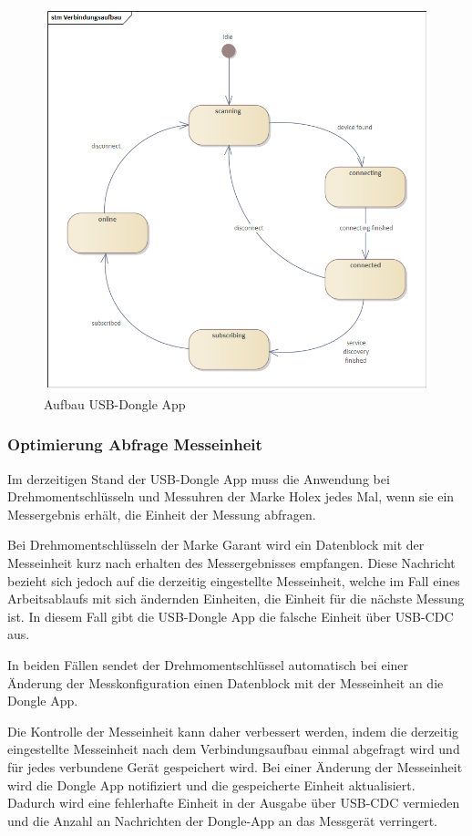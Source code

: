 \begin{figure}[H] 
	\centering
	\includegraphics[width=\textwidth]{figures/Verbindungsaufbau.png}
	\caption{Aufbau USB-Dongle App}
\end{figure}

\subsubsection{Optimierung Abfrage Messeinheit} 
Im derzeitigen Stand der USB-Dongle App muss die Anwendung bei Drehmomentschlüsseln und Messuhren der Marke Holex jedes Mal, wenn sie ein Messergebnis erhält, die Einheit der Messung abfragen. 

Bei Drehmomentschlüsseln der Marke Garant wird ein Datenblock mit der Messeinheit kurz nach erhalten des Messergebnisses empfangen. Diese Nachricht bezieht sich jedoch auf die derzeitig eingestellte Messeinheit, welche im Fall eines Arbeitsablaufs mit sich ändernden Einheiten, die Einheit für die nächste Messung ist. In diesem Fall gibt die USB-Dongle App die falsche Einheit über USB-CDC aus. 

In beiden Fällen sendet der Drehmomentschlüssel automatisch bei einer Änderung der Messkonfiguration einen Datenblock mit der Messeinheit an die Dongle App. 

Die Kontrolle der Messeinheit kann daher verbessert werden, indem die derzeitig eingestellte Messeinheit nach dem Verbindungsaufbau einmal abgefragt wird und für jedes verbundene Gerät gespeichert wird. Bei einer Änderung der Messeinheit wird die Dongle App notifiziert und die gespeicherte Einheit aktualisiert. Dadurch wird eine fehlerhafte Einheit in der Ausgabe über USB-CDC vermieden und die Anzahl an Nachrichten der Dongle-App an das Messgerät verringert.

